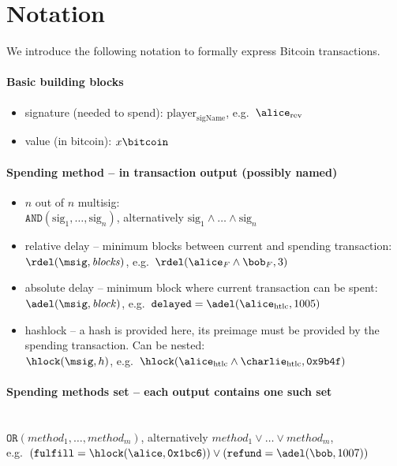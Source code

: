 \section{Notation}
  We introduce the following notation to formally express Bitcoin transactions.

  \paragraph{Basic building blocks}
    \begin{itemize}
      \item signature (needed to spend): $\mathrm{player}_{\mathrm{sigName}}$,
      e.g.\ $\alice_{\mathrm{rev}}$
      \item value (in bitcoin): $x\bitcoin$
    \end{itemize}

  \paragraph{Spending method -- in transaction output (possibly named)}
    \begin{itemize}
      \item $n$ out of $n$ multisig: \\
      $\mathtt{AND}(\mathrm{sig}_1, \dots, \mathrm{sig}_n)$, alternatively
      $\mathrm{sig}_1 \wedge \dots \wedge \mathrm{sig}_n$
      \item relative delay -- minimum blocks between current and spending
      transaction: \\
      $\rdel(\msig, \mathit{blocks})$, e.g.\ $\rdel(\alice_{F} \wedge \bob_{F},
      3)$
      \item absolute delay -- minimum block where current transaction can be
      spent: \\
      $\adel(\msig, \mathit{block})$, e.g.\ $\mathtt{delayed} =
      \adel(\alice_{\mathrm{htlc}}, 1005)$
      \item hashlock -- a hash is provided here, its preimage must be provided
      by the spending transaction. Can be nested:  \\
      $\hlock(\msig, h)$, e.g.\ $\hlock(\alice_{\mathrm{htlc}} \wedge
      \charlie_{\mathrm{htlc}}, \mathtt{0x9b4f})$
    \end{itemize}

  \paragraph{Spending methods set -- each output contains one such set} \ \\
    $\mathtt{OR}(\mathit{method}_1, \dots, \mathit{method}_m)$,
    alternatively $\mathit{method}_1 \vee \dots \vee \mathit{method}_m$, \\
    e.g.\ $(\mathtt{fulfill} = \hlock(\alice, \mathtt{0x1bc6})) \vee
    (\mathtt{refund} = \adel(\bob, 1007))$

